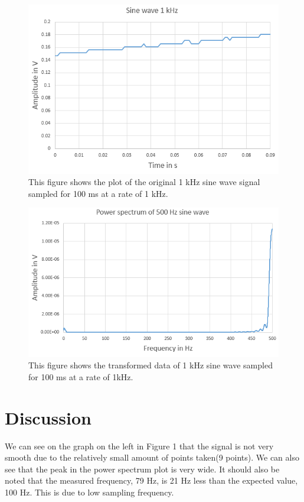 \documentclass{article}
\begin{document}
\begin{figure}[H]
\includegraphics[scale=0.7,center]{Signal2xNyquist.PNG}
\caption{This figure shows the plot of the original 1 kHz sine wave signal sampled for 100 ms at a rate of 1 kHz.}
\end{figure}

\begin{figure}[H]
\includegraphics[scale=0.7,center]{FourierNyquist.PNG}
\caption{This figure shows the transformed data of 1 kHz sine wave sampled for 100 ms at a rate of 1kHz.}
\end{figure}

\section{Discussion}

We can see on the graph on the left in Figure 1 that the signal is not very smooth due to the relatively small amount of points taken(9 points).  We can also see that the peak in the power spectrum plot is very wide.  It should also be noted that the measured frequency, 79 Hz, is 21 Hz less than the expected value, 100 Hz.  This is due to low sampling frequency.
 
\end{document}
